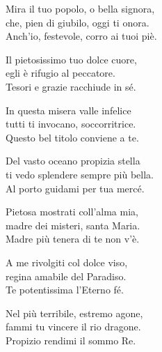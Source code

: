 
\strofa Mira il tuo popolo, o bella signora,\\
che, pien di giubilo, oggi ti onora.\\
Anch'io, festevole, corro ai tuoi piè.

\spazio


\spazio

\strofa Il pietosissimo tuo dolce cuore,\\
egli è rifugio al peccatore.\\
Tesori e grazie racchiude in sé.

\spazio


\spazio

\strofa In questa misera valle infelice\\
tutti ti invocano, soccorritrice.\\
Questo bel titolo conviene a te.

\spazio


\spazio

\strofa Del vasto oceano propizia stella\\
ti vedo splendere sempre più bella.\\
Al porto guidami per tua mercé.

\spazio


\spazio

\strofa Pietosa mostrati coll'alma mia,\\
madre dei misteri, santa Maria.\\
Madre più tenera di te non v'è.

\spazio


\spazio

\strofa A me rivolgiti col dolce viso,\\
regina amabile del Paradiso.\\
Te potentissima l'Eterno fé.

\spazio


\spazio

\strofa Nel più terribile, estremo agone,\\
fammi tu vincere il rio dragone.\\
Propizio rendimi il sommo Re.

\spazio

